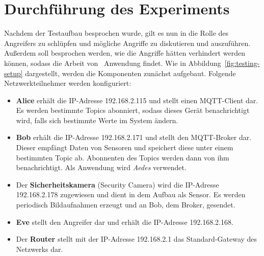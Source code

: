 \section{Durchführung des Experiments}
Nachdem der Testaufbau besprochen wurde, gilt es nun in die Rolle des Angreifers
zu schlüpfen und mögliche Angriffe zu diskutieren und auszuführen. Außerdem soll
besprochen werden, wie die Angriffe hätten verhindert werden können, sodass die
Arbeit von~\cite{paper} Anwendung findet. Wie in
Abbildung~\ref{fig:testing-setup} dargestellt, werden die Komponenten zunächst
aufgebaut. Folgende Netzwerkteilnehmer werden konfiguriert:

\begin{itemize}
  \item \textbf{Alice} erhält die IP-Adresse 192.168.2.115 und stellt einen
    MQTT-Client dar. Es werden bestimmte Topics abonniert, sodass dieses Gerät
    benachrichtigt wird, falls sich bestimmte Werte im System ändern.
  \item \textbf{Bob} erhält die IP-Adresse 192.168.2.171 und stellt den
    MQTT-Broker dar. Dieser empfängt Daten von Sensoren und speichert diese
    unter einem bestimmten Topic ab. Abonnenten des Topics werden dann von ihm
    benachrichtigt. Als Anwendung wird \textit{Aedes} verwendet.
  \item Der \textbf{Sicherheitskamera} (Security Camera) wird die IP-Adresse
    192.168.2.178 zugewiesen und dient in dem Aufbau als Sensor. Es werden
    periodisch Bildaufnahmen erzeugt und an Bob, dem Broker, gesendet.
  \item \textbf{Eve} stellt den Angreifer dar und erhält die IP-Adresse
    192.168.2.168.
  \item Der \textbf{Router} stellt mit der IP-Adresse 192.168.2.1 das
    Standard-Gateway des Netzwerks dar.
\end{itemize}

